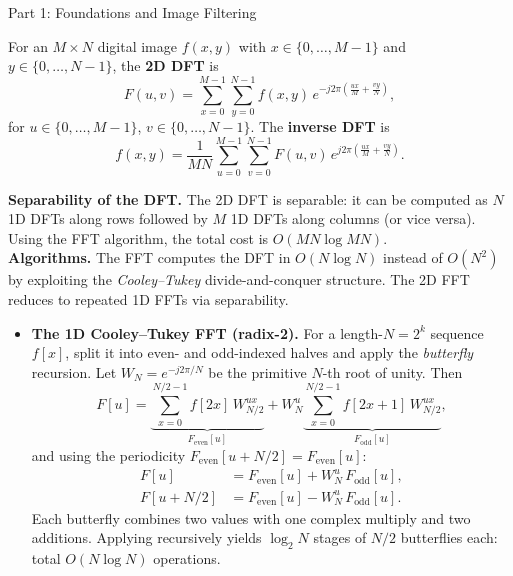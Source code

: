 \documentclass[letterpaper]{article}
\begin{document}
\begin{notes}{Part 1: Foundations and Image Filtering}

For an $M\times N$ digital image $f(x,y)$ with $x\in\{0,\dots,M-1\}$ and $y\in\{0,\dots,N-1\}$, the \textbf{2D DFT} is
$$F(u,v) = \sum_{x=0}^{M-1}\sum_{y=0}^{N-1} f(x,y)\, e^{-j2\pi\!\left(\frac{ux}{M}+\frac{vy}{N}\right)},$$
for $u\in\{0,\dots,M-1\}$, $v\in\{0,\dots,N-1\}$. The \textbf{inverse DFT} is
$$f(x,y) = \frac{1}{MN}\sum_{u=0}^{M-1}\sum_{v=0}^{N-1} F(u,v)\, e^{j2\pi\!\left(\frac{ux}{M}+\frac{vy}{N}\right)}.$$

\textbf{Separability of the DFT.}
The 2D DFT is separable: it can be computed as $N$ 1D DFTs along rows followed by $M$ 1D DFTs along columns (or vice versa). Using the FFT algorithm, the total cost is $O(MN\log MN)$.\\


\textbf{Algorithms.} The FFT computes the DFT in $O(N\log N)$ instead of $O(N^2)$ by exploiting the \emph{Cooley--Tukey} divide-and-conquer structure. The 2D FFT reduces to repeated 1D FFTs via separability.

\begin{itemize}
    \item \textbf{The 1D Cooley--Tukey FFT (radix-2).} For a length-$N = 2^k$ sequence $f[x]$, split it into even- and odd-indexed halves and apply the \emph{butterfly} recursion. Let $W_N = e^{-j2\pi/N}$ be the primitive $N$-th root of unity. Then
    $$F[u] = \underbrace{\sum_{x=0}^{N/2-1} f[2x]\,W_{N/2}^{ux}}_{F_{\mathrm{even}}[u]} + W_N^u \underbrace{\sum_{x=0}^{N/2-1} f[2x+1]\,W_{N/2}^{ux}}_{F_{\mathrm{odd}}[u]},$$
    and using the periodicity $F_{\mathrm{even}}[u + N/2] = F_{\mathrm{even}}[u]$:
    \begin{align*}
    F[u]       &= F_{\mathrm{even}}[u] + W_N^u\,F_{\mathrm{odd}}[u], \\
    F[u+N/2]   &= F_{\mathrm{even}}[u] - W_N^u\,F_{\mathrm{odd}}[u].
    \end{align*}
    Each butterfly combines two values with one complex multiply and two additions. Applying recursively yields $\log_2 N$ stages of $N/2$ butterflies each: total $O(N\log N)$ operations.
    

\end{itemize}
\end{notes}
\end{document}
